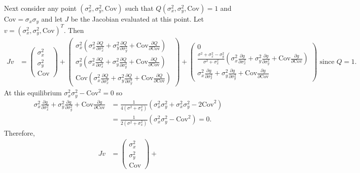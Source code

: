 \documentclass{article}
\newcommand{\Cov}{\text{Cov}}
\begin{document}
\begin{enumerate}
Next consider any point $(\sigma_x^2,\sigma_y^2,\Cov)$ such that $Q(\sigma_x^2,\sigma_y^2,\Cov)=1$ and $\Cov=\sigma_x\sigma_y$ and let $J$ be the Jacobian evaluated at this point. Let $v=(\sigma_x^2,\sigma_y^2,\Cov)^T$. Then
\begin{align*}
Jv&=\left(\begin{array}{c}\sigma_x^2 \\ \sigma_y^2 \\ \Cov \end{array}\right)+
\left(\begin{array}{c}
\sigma_x^2\left(\sigma_x^2\frac{\partial Q}{\partial \sigma_x^2}+\sigma_y^2\frac{\partial Q}{\partial \sigma_y^2}+\Cov\frac{\partial Q}{\partial \Cov}\right) 
\\ \sigma_y^2\left(\sigma_x^2\frac{\partial Q}{\partial \sigma_x^2}+\sigma_y^2\frac{\partial Q}{\partial \sigma_y^2}+\Cov\frac{\partial Q}{\partial \Cov}\right)
\\ \Cov\left(\sigma_x^2\frac{\partial Q}{\partial \sigma_x^2}+\sigma_y^2\frac{\partial Q}{\partial \sigma_y^2}+\Cov\frac{\partial Q}{\partial \Cov}\right) \end{array}\right)
+ \left(\begin{array}{c} 
0 
\\ \frac{\sigma^2+\sigma_x^2-\sigma_y^2}{\sigma^2+\sigma_x^2}\left(\sigma_x^2\frac{\partial g}{\partial \sigma_x^2}+\sigma_y^2\frac{\partial g}{\partial \sigma_y^2}+\Cov\frac{\partial g}{\partial \Cov}\right)
\\ \sigma_x^2\frac{\partial g}{\partial \sigma_x^2}+\sigma_y^2\frac{\partial g}{\partial \sigma_y^2}+\Cov\frac{\partial g}{\partial \Cov}
\end{array}\right) \text{ since $Q=1$}.
\end{align*}
At this equilibrium $\sigma_x^2\sigma_y^2-\Cov^2=0$ so 
\begin{align*}
\sigma_x^2\frac{\partial g}{\partial \sigma_x^2}+\sigma_y^2\frac{\partial g}{\partial \sigma_y^2}+\Cov\frac{\partial g}{\partial \Cov}&=\frac{1}{4(\sigma^2+\sigma_x^2)}(\sigma_x^2\sigma_y^2+\sigma_x^2\sigma_y^2-2\Cov^2)
\\&=\frac{1}{2(\sigma^2+\sigma_x^2)}(\sigma_x^2\sigma_y^2-\Cov^2)=0.
\end{align*}
Therefore,
\begin{align*}
Jv&=\left(\begin{array}{c}\sigma_x^2 \\ \sigma_y^2 \\ \Cov \end{array}\right)+

\end{align*}
\end{enumerate}
\end{document}
